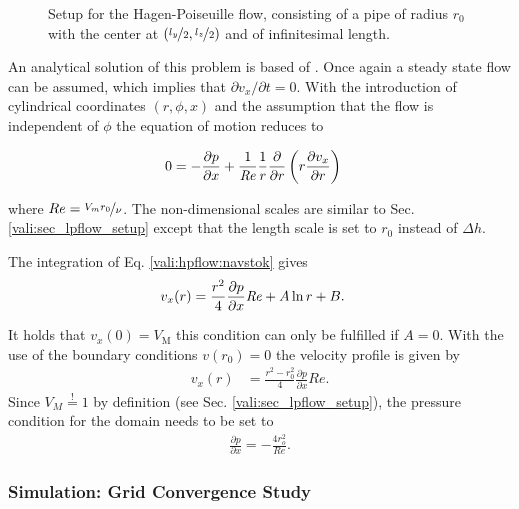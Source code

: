 \begin{figure}[!bp]
      \centering
      \caption{Setup for the Hagen-Poiseuille flow, consisting of a pipe of radius $r_0$ with the center at  ${(\nicefrac{l_y}{2}, \nicefrac{l_z}{2})}$ and of infinitesimal length.}
    \label{validation:setup_hpflow}
\end{figure}

An analytical solution of this problem is based of \citep{Kundu2012}.
Once again a steady state flow can be assumed, which implies that $\partial v_x/\partial t = 0$. With the introduction of cylindrical coordinates $(r, \phi, x)$
and the assumption that the flow is independent of $\phi$ the equation of motion reduces to

\begin{align}
    \label{vali:hpflow:navstok}
        0 &= - \frac{\partial p}{\partial x}  +  \frac{1}{\mbox{\textit{Re}}} \frac{1}{r}\frac{\partial}{\partial r}\left(r\frac{\partial v_x}{\partial r}\right)
\end{align}

where $Re = \nicefrac{V_{m}r_0}{\nu}$.
The non-dimensional scales are similar to Sec. \ref{vali:sec_lpflow_setup}  except that the length scale is set to $r_0$ instead of $\Delta h$.

The integration of Eq. \ref{vali:hpflow:navstok} gives
\begin{align}
    v_x(r) &= \frac{r^2}{4}\frac{\partial p}{\partial x}\mbox{\textit{Re}} + A \ln r + B.
\end{align}

It holds that $v_x(0)= V_{\text{M}}$ this condition can only be fulfilled if $A=0$.
With the use of the boundary conditions $v(r_0) = 0$ the velocity profile is given by
\begin{align}
    v_x(r) &= \frac{r^2 - r_0^2}{4}\frac{\partial p}{\partial x}Re.
\end{align}
Since $V_{M} \stackrel{!}{=} 1$ by definition (see Sec. \ref{vali:sec_lpflow_setup}),
 the pressure condition for the domain needs to be set to
\begin{align}
    \frac{\partial p}{\partial x} = -\frac{4 r_o^2}{Re}.
\end{align}

\subsubsection{Simulation: Grid Convergence Study}

